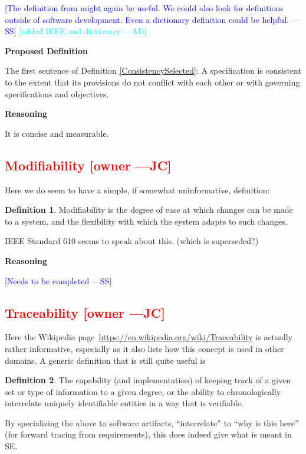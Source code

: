 \documentclass[letterpaper,cleveref]{lipics-v2019}
\newcommand{\authornote}[3]{\textcolor{#1}{[#3 ---#2]}}
\newcommand{\authornote}[3]{}
\newcommand{\wss}[1]{\authornote{blue}{SS}{#1}} %
\newcommand{\jc}[1]{\authornote{red}{JC}{#1}} %
\newcommand{\ad}[1]{\authornote{cyan}{AD}{#1}} %
\newcommand{\notdone}[1]{\textcolor{red}{#1}}
\theoremstyle{definition}
\newtheorem{defn}{Definition}
\begin{document}
\wss{The definition from \citet{IEEE1998} might again be useful.  We could also
  look for definitions outside of software development.  Even a dictionary
  definition could be helpful.}
\ad{added IEEE and dictionary}

\noindent \textbf{Proposed Definition} 

The first sentence of Definition \ref{ConsistencySelected}: A specification is
consistent to the extent that its provisions do not conflict with each other or
with governing specifications and objectives.

\noindent \textbf{Reasoning}

It is concise and measurable.

\subsection{\notdone{Modifiability} \jc{owner}}

Here we do seem to have a simple, if somewhat uninformative, definition:

\begin{defn}
  Modifiability is the degree of ease at which changes can be made to a system,
  and the flexibility with which the system adapts to such changes.
\end{defn}

IEEE Standard 610 seems to speak about this. (which is superseded?)

\noindent \textbf{Reasoning}

\wss{Needs to be completed}

\subsection{\notdone{Traceability} \jc{owner}}

Here the Wikipedia page~\url{https://en.wikipedia.org/wiki/Traceability} is
actually rather informative, especially as it also lists how this concept is
used in other domains.  A generic definition that is still quite useful is
\begin{defn}
  The capability (and implementation) of keeping track of a given set or type of
  information to a given degree, or the ability to chronologically interrelate
  uniquely identifiable entities in a way that is verifiable.
\end{defn}
By specializing the above to software artifacts, ``interrelate'' to ``why is
this here'' (for forward tracing from requirements), this does indeed give what
is meant in SE.
\end{document}
